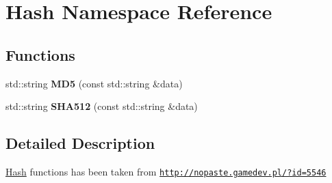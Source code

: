 \hypertarget{namespaceHash}{
\section{Hash Namespace Reference}
\label{namespaceHash}
}
\subsection*{Functions}
\begin{DoxyCompactItemize}
\item 
\hypertarget{namespaceHash_a7afbbfafc36ad2234ab868f3c1922025}{
std::string {\bfseries MD5} (const std::string \&data)}
\label{namespaceHash_a7afbbfafc36ad2234ab868f3c1922025}

\item 
\hypertarget{namespaceHash_ad2302a0ddd0cf8b6b023c0bd1483d162}{
std::string {\bfseries SHA512} (const std::string \&data)}
\label{namespaceHash_ad2302a0ddd0cf8b6b023c0bd1483d162}

\end{DoxyCompactItemize}


\subsection{Detailed Description}
\hyperlink{namespaceHash}{Hash} functions has been taken from \href{http://nopaste.gamedev.pl/?id=5546}{\tt http://nopaste.gamedev.pl/?id=5546} 